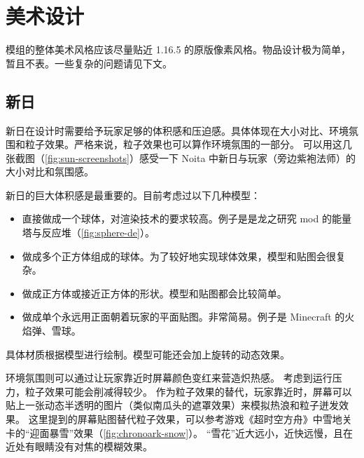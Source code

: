 \documentclass[11pt]{article}
\begin{document}
    \clearpage
    \section{美术设计}\label{sec:artistic}

    模组的整体美术风格应该尽量贴近 1.16.5 的原版像素风格。物品设计极为简单，暂且不表。一些复杂的问题请见下文。

    \subsection{新日}\label{subsec:design-sun}

    新日在设计时需要给予玩家足够的体积感和压迫感。具体体现在大小对比、环境氛围和粒子效果。严格来说，粒子效果也可以算作环境氛围的一部分。
    可以用这几张截图（\ref{fig:sun-screenshots}）感受一下 Noita 中新日与玩家（旁边紫袍法师）的大小对比和氛围感。

    新日的巨大体积感是最重要的。目前考虑过以下几种模型：
    \begin{itemize}
        \item 直接做成一个球体，对渲染技术的要求较高。例子是是龙之研究 mod 的能量塔与反应堆（\ref{fig:sphere-de}）。
        \item 做成多个正方体组成的球体。为了较好地实现球体效果，模型和贴图会很复杂。
        \item 做成正方体或接近正方体的形状。模型和贴图都会比较简单。
        \item 做成单个永远用正面朝着玩家的平面贴图。非常简易。例子是 Minecraft 的火焰弹、雪球。
    \end{itemize}
    具体材质根据模型进行绘制。模型可能还会加上旋转的动态效果。

    环境氛围则可以通过让玩家靠近时屏幕颜色变红来营造炽热感。
    考虑到运行压力，粒子效果可能会削减得较少。
    作为粒子效果的替代，玩家靠近时，屏幕可以贴上一张动态半透明的图片（类似南瓜头的遮罩效果）来模拟热浪和粒子迸发效果。
    这里提到的屏幕贴图替代粒子效果，可以参考游戏《超时空方舟》中雪地关卡的“迎面暴雪”效果（\ref{fig:chronoark-snow}）。
    “雪花”近大远小，近快远慢，且在近处有眼睛没有对焦的模糊效果。
\end{document}
